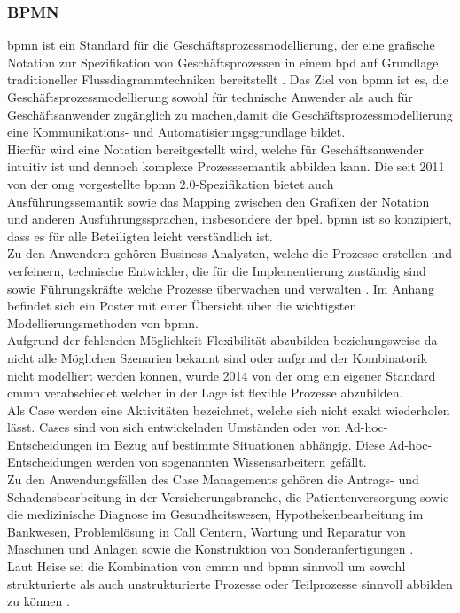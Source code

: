 \documentclass[a4paper, 12pt, twoside, headsepline=true]{scrartcl} %
\begin{document}
\subsubsection{BPMN}

\ac{bpmn} ist ein Standard für die Geschäftsprozessmodellierung, der eine grafische Notation zur Spezifikation von Geschäftsprozessen in einem \ac{bpd} auf Grundlage traditioneller Flussdiagrammtechniken bereitstellt \cite[S.222]{Aagesen2015}. Das Ziel von \ac{bpmn} ist es, die Geschäftsprozessmodellierung sowohl für technische Anwender als auch für Geschäftsanwender zugänglich zu machen,damit die Geschäftsprozessmodellierung eine Kommunikations- und Automatisierungsgrundlage bildet.\\
 Hierfür wird eine Notation bereitgestellt wird, welche für Geschäftsanwender intuitiv ist und dennoch komplexe Prozesssemantik abbilden kann. Die seit 2011 von der \ac{omg} vorgestellte \ac{bpmn} 2.0-Spezifikation bietet auch Ausführungssemantik sowie das Mapping zwischen den Grafiken der Notation und anderen Ausführungssprachen, insbesondere der \ac{bpel}. \ac{bpmn} ist so konzipiert, dass es für alle Beteiligten leicht verständlich ist. \\
Zu den Anwendern gehören Business-Analysten, welche die Prozesse erstellen und verfeinern, technische Entwickler, die für die Implementierung zuständig sind sowie Führungskräfte welche Prozesse überwachen und verwalten \cite{vonRosing2015433}. Im Anhang befindet sich ein Poster mit einer Übersicht über die wichtigsten Modellierungsmethoden von \ac{bpmn}. \\
\newline
Aufgrund der fehlenden Möglichkeit Flexibilität abzubilden beziehungsweise da nicht alle Möglichen Szenarien bekannt sind oder aufgrund der Kombinatorik nicht modelliert werden können, wurde 2014 von der \ac{omg} ein eigener Standard \ac{cmmn} verabschiedet welcher in der Lage ist flexible Prozesse abzubilden.\\
 Als Case werden eine Aktivitäten bezeichnet, welche sich nicht exakt wiederholen lässt. Cases sind von sich entwickelnden Umständen oder von Ad-hoc-Entscheidungen im Bezug auf bestimmte Situationen abhängig. Diese Ad-hoc-Entscheidungen werden von sogenannten Wissensarbeitern gefällt.\\
 Zu den Anwendungsfällen des Case Managements gehören die Antrags- und Schadensbearbeitung in der Versicherungsbranche, die Patientenversorgung sowie die medizinische Diagnose im Gesundheitswesen, Hypothekenbearbeitung im Bankwesen, Problemlösung in Call Centern, Wartung und Reparatur von Maschinen und Anlagen sowie die Konstruktion von Sonderanfertigungen\cite{cmmnomg} . \\
Laut Heise sei die Kombination von \ac{cmmn} und \ac{bpmn} sinnvoll um sowohl strukturierte als auch unstrukturierte Prozesse oder Teilprozesse sinnvoll abbilden zu können \cite{cmmnheise}.
\end{document}
